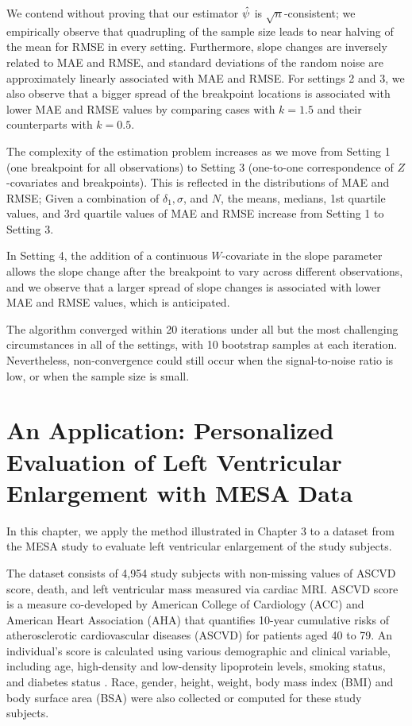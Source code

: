 \documentclass [12pt, proquest] {uwthesis}[2016/11/22]
\begin{document}
We contend without proving that our estimator $\Hat{\psi}$ is $\sqrt{n}$-consistent; we empirically observe that quadrupling of the sample size leads to near halving of the mean for RMSE in every setting. Furthermore, slope changes are inversely related to MAE and RMSE, and standard deviations of the random noise are approximately linearly associated with MAE and RMSE. For settings 2 and 3, we also observe that a bigger spread of the breakpoint locations is associated with lower MAE and RMSE values by comparing cases with $k = 1.5$ and their counterparts with $k = 0.5$.

The complexity of the estimation problem increases as we move from Setting 1 (one breakpoint for all observations) to Setting 3 (one-to-one correspondence of $Z$-covariates and breakpoints). This is reflected in the distributions of MAE and RMSE; Given a combination of $\delta_1, \sigma$, and $N$, the means, medians, 1st quartile values, and 3rd quartile values of MAE and RMSE increase from Setting 1 to Setting 3.

In Setting 4, the addition of a continuous $W$-covariate in the slope parameter allows the slope change after the breakpoint to vary across different observations, and we observe that a larger spread of slope changes is associated with lower MAE and RMSE values, which is anticipated.

The algorithm converged within 20 iterations under all but the most challenging circumstances in all of the settings, with 10 bootstrap samples at each iteration. Nevertheless, non-convergence could still occur when the signal-to-noise ratio is low, or when the sample size is small.


\chapter{An Application: Personalized Evaluation of Left Ventricular Enlargement with MESA Data}
In this chapter, we apply the method illustrated in Chapter 3 to a dataset from the MESA study to evaluate left ventricular enlargement of the study subjects. 

The dataset consists of 4,954 study subjects with non-missing values of ASCVD score, death, and left ventricular mass measured via cardiac MRI. ASCVD score is a measure co-developed by American College of Cardiology (ACC) and American Heart Association (AHA) that quantifies 10-year cumulative risks of atherosclerotic cardiovascular diseases (ASCVD) for patients aged 40 to 79. An individual's score is calculated using various demographic and clinical variable, including age, high-density and low-density lipoprotein levels, smoking status, and diabetes status \cite{ASCVD}. Race, gender, height, weight, body mass index (BMI) and body surface area (BSA) were also collected or computed for these study subjects. %
\end{document}
